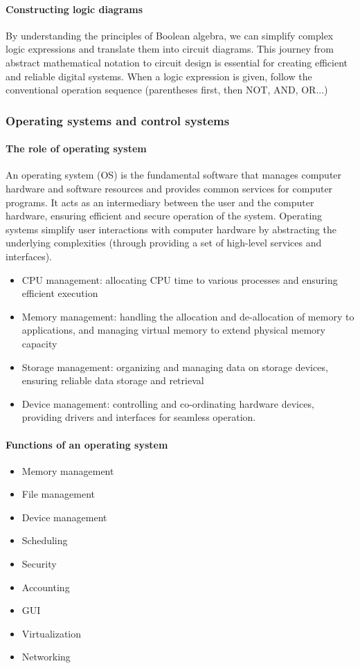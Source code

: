 \paragraph{Constructing logic diagrams}
By understanding the principles of Boolean algebra, we can simplify complex logic expressions and translate them into circuit diagrams. This journey from abstract mathematical notation 
to circuit design is essential for creating efficient and reliable digital systems. When a logic expression is given, follow the conventional operation sequence (parentheses first, then NOT, AND, OR...) 
\subsubsection{Operating systems and control systems}
\paragraph{The role of operating system}
An operating system (OS) is the fundamental software that manages computer hardware 
and software resources and provides common services for computer programs. It acts as an intermediary between the user and the computer hardware, ensuring efficient and secure operation of the system. Operating systems simplify user interactions with computer hardware by abstracting the underlying complexities (through providing a set of high-level services and interfaces).
\begin{itemize}
    \item CPU management: allocating CPU time to various processes and ensuring 
efficient execution 
	\item Memory management: handling the allocation and de-allocation of memory to 
applications, and managing virtual memory to extend physical memory capacity 
\item Storage management: organizing and managing data on storage devices, ensuring reliable data storage and retrieval 
\item Device management: controlling and co-ordinating hardware devices, providing drivers and interfaces for seamless operation. 
\end{itemize}
\paragraph{Functions of an operating system}
\begin{itemize}
    \item Memory management
    \item File management
    \item Device management
    \item Scheduling
    \item Security
    \item Accounting
    \item GUI
    \item Virtualization
    \item Networking
\end{itemize}
